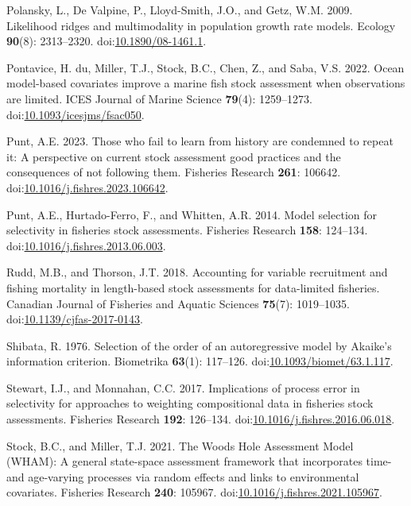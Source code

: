 \documentclass[
  12pt,
]{article}
\newlength{\cslhangindent}
\newenvironment{CSLReferences}[2] %
 {\begin{list}{}{%
  \setlength{\itemindent}{0pt} %
  \setlength{\leftmargin}{0pt} %
  \setlength{\parsep}{0pt} %
  \ifodd #1
   \setlength{\leftmargin}{\cslhangindent} %
   \setlength{\itemindent}{-1\cslhangindent} %
  \fi
  \setlength{\itemsep}{#2\baselineskip}}} %
 {\end{list}} %
\begin{document}
\begin{CSLReferences}{1}{0}
Polansky, L., De Valpine, P., Lloyd-Smith, J.O., and Getz, W.M. 2009.
Likelihood ridges and multimodality in population growth rate models.
Ecology \textbf{90}(8): 2313--2320.
doi:\href{https://doi.org/10.1890/08-1461.1}{10.1890/08-1461.1}.

Pontavice, H. du, Miller, T.J., Stock, B.C., Chen, Z., and Saba, V.S.
2022. Ocean model-based covariates improve a marine fish stock
assessment when observations are limited. ICES Journal of Marine Science
\textbf{79}(4): 1259--1273.
doi:\href{https://doi.org/10.1093/icesjms/fsac050}{10.1093/icesjms/fsac050}.

Punt, A.E. 2023. Those who fail to learn from history are condemned to
repeat it: A perspective on current stock assessment good practices and
the consequences of not following them. Fisheries Research \textbf{261}:
106642.
doi:\href{https://doi.org/10.1016/j.fishres.2023.106642}{10.1016/j.fishres.2023.106642}.

Punt, A.E., Hurtado-Ferro, F., and Whitten, A.R. 2014. Model selection
for selectivity in fisheries stock assessments. Fisheries Research
\textbf{158}: 124--134.
doi:\href{https://doi.org/10.1016/j.fishres.2013.06.003}{10.1016/j.fishres.2013.06.003}.

Rudd, M.B., and Thorson, J.T. 2018. Accounting for variable recruitment
and fishing mortality in length-based stock assessments for data-limited
fisheries. Canadian Journal of Fisheries and Aquatic Sciences
\textbf{75}(7): 1019--1035.
doi:\href{https://doi.org/10.1139/cjfas-2017-0143}{10.1139/cjfas-2017-0143}.

Shibata, R. 1976. Selection of the order of an autoregressive model by
{A}kaike's information criterion. Biometrika \textbf{63}(1): 117--126.
doi:\href{https://doi.org/10.1093/biomet/63.1.117}{10.1093/biomet/63.1.117}.

Stewart, I.J., and Monnahan, C.C. 2017. Implications of process error in
selectivity for approaches to weighting compositional data in fisheries
stock assessments. Fisheries Research \textbf{192}: 126--134.
doi:\href{https://doi.org/10.1016/j.fishres.2016.06.018}{10.1016/j.fishres.2016.06.018}.

Stock, B.C., and Miller, T.J. 2021. The {W}oods {H}ole {A}ssessment
{M}odel ({WHAM}): {A} general state-space assessment framework that
incorporates time- and age-varying processes via random effects and
links to environmental covariates. Fisheries Research \textbf{240}:
105967.
doi:\href{https://doi.org/10.1016/j.fishres.2021.105967}{10.1016/j.fishres.2021.105967}.


\end{CSLReferences}
\end{document}

